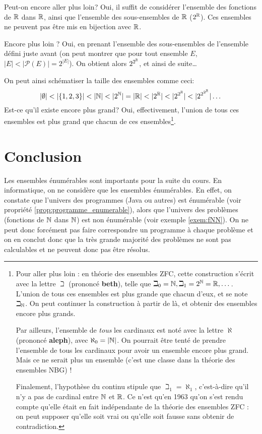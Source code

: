 Peut-on encore aller plus loin?  Oui, il suffit de considérer l'ensemble des fonctions de $\mathbb{R}$ dans $\mathbb{R}$, ainsi que
l'ensemble des sous-ensembles de $\mathbb{R}$ ($2^{\mathbb{R}}$). Ces ensembles ne peuvent pas être mis en bijection avec $\mathbb{R}$.

Encore plus loin ? Oui, en prenant l'ensemble des sous-ensembles de l'ensemble défini juste avant (on peut montrer que pour tout ensemble $E$, $|E|<|\mathcal{P}(E)|=2^{|E|}$). On obtient alors $2^{2^{\mathbb{R}}}$, et ainsi de suite\ldots

On peut ainsi schématiser la taille des ensembles comme ceci:
$$|\emptyset| < |\{1,2,3\}| < |\mathbb{N}| < |2^{\mathbb{N}}| = |\mathbb{R}| < |2^{\mathbb{R}}| < |2^{2^{\mathbb{R}}}| < |2^{2^{2^{\mathbb{R}}}}| \dots$$
Est-ce qu'il existe encore plus grand? Oui, effectivement, l'union de tous ces ensembles
est plus grand que chacun de ces ensembles\footnote{
Pour aller plus loin : en théorie des ensembles ZFC, cette construction s'écrit avec la lettre $\beth$ (prononcé \textbf{beth}), telle que $\beth_0 = \mathbb{N}, \beth_1 = 2^{\mathbb{N}} = \mathbb{R},\dots$. L'union de tous ces ensembles est plus grande que chacun d'eux, et se note $\beth_{\mathbb{N}}$. On peut continuer la construction à partir de là, et obtenir des ensembles encore plus grands.

Par ailleurs, l'ensemble de \emph{tous} les cardinaux est noté avec la lettre $\aleph$ (prononcé \textbf{aleph}), avec $\aleph_0 = \left\lvert\mathbb{N}\right\lvert$. On pourrait être tenté de prendre l'ensemble de tous les cardinaux pour avoir un ensemble encore plus grand. Mais ce ne serait plus un ensemble (c'est une classe dans la théorie des ensembles NBG) !

Finalement, l'hypothèse du continu stipule que $\beth_1 = \aleph_1$, c'est-à-dire qu'il n'y a pas de cardinal entre $\mathbb{N}$ et $\mathbb{R}$. Ce n'est qu'en 1963 qu'on s'est rendu compte qu'elle était en fait indépendante de la théorie des ensembles ZFC : on peut supposer qu'elle soit vrai ou qu'elle soit fausse sans obtenir de contradiction.}.


\section{Conclusion}
\label{sec:concept_conclusion}

Les ensembles énumérables sont importants pour la suite du cours. En
informatique, on ne considère que les ensembles énumérables. En effet, on constate que l'univers des programmes (Java ou autres) est énumérable (voir propriété \ref{prop:programme_enumerable}), alors que l'univers des problèmes (fonctions de $\mathbb{N}$ dans $\mathbb{N}$) est non énumérable (voir exemple \ref{exem:fNN}).
On ne peut donc forcément pas faire correspondre un programme à chaque problème et on en conclut donc que la très grande majorité des problèmes ne sont pas calculables et ne peuvent donc pas être résolus.

